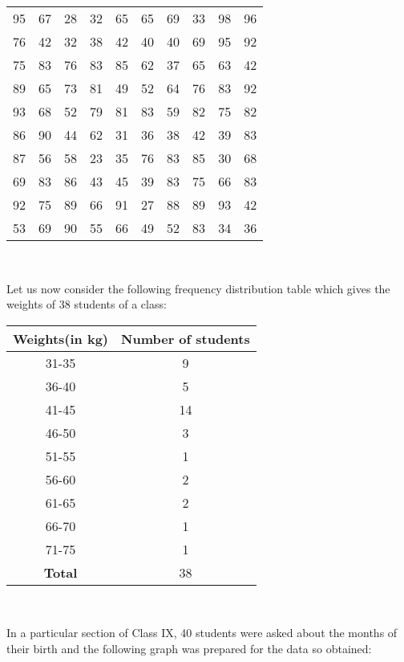 \begin{tabular}{cccccccccc}
95 &67 &28 &32 &65 &65 &69 &33 &98 &96\\
76 &42 &32 &38 &42 &40 &40 &69 &95 &92\\
75 &83 &76 &83 &85 &62 &37 &65 &63 &42\\
89 &65 &73 &81 &49 &52 &64 &76 &83 &92\\
93 &68 &52 &79 &81 &83 &59 &82 &75 &82\\
86 &90 &44 &62 &31 &36 &38 &42 &39 &83\\
87 &56 &58 &23 &35 &76 &83 &85 &30 &68\\
69 &83 &86 &43 &45 &39 &83 &75 &66 &83\\
92 &75 &89 &66 &91 &27 &88 &89 &93 &42\\
53 &69 &90 &55 &66 &49 &52 &83 &34 &36\\
\end{tabular}\\
\item Let us now consider the following frequency distribution table which gives the weights of 38 students of a class:\\
\begin{tabular}{|c|c|}
\hline
\textbf{Weights(in kg)} &\textbf{Number of students}\\
\hline
31-35 &9\\
36-40 &5\\
41-45 &14\\
46-50 &3\\
51-55 &1\\
56-60 &2\\
61-65 &2\\
66-70 &1\\
71-75 &1\\
\hline
\textbf{Total} &38\\
\hline
\end{tabular}\\
\item In a particular section of Class IX, 40 students were asked about the months of their birth and the following graph was prepared for the data so obtained:\\

\\

